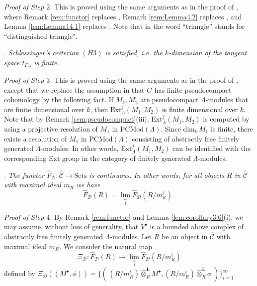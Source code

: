 \documentclass{amsart}
\theoremstyle{plain}
\theoremstyle{definition}
\theoremstyle{remark}
\begin{document}
\medskip

\noindent\textit{Proof of Step $2$.} This is proved using the same arguments as in the proof of 
\cite[Lemmas 6.1 and 6.3]{bcderived}, where 
Remark \ref{rem:functor} replaces \cite[Prop. 2.12]{bcderived}, 
Remark \ref{rem:Lemma4.2} replaces \cite[Lemma 4.2]{bcderived}, and
Lemma \ref{lem:Lemma14.1} replaces \cite[Lemma 14.1]{bcderived}.
Note that in \cite{bcderived}  the word ``triangle'' stands for ``distinguished triangle".

\medskip

. \textit{Schlessinger's criterion $(H3)$ is satisfied, i.e.
the $k$-dimension of the tangent space $t_{F_{\mathcal{D}}}$ is finite.}

\medskip

\noindent\textit{Proof of Step $3$.} This is proved using the same arguments as in the proof of 
\cite[Prop. 6.4]{bcderived}, except that we replace the assumption in \cite{bcderived} 
that $G$ has finite pseudocompact cohomology by the following fact. If $M_1,M_2$ are 
pseudocompact $\Lambda$-modules that are finite dimensional over $k$, then
$\mathrm{Ext}^j_\Lambda(M_1,M_2)$ is finite dimensional over $k$. Note that
by Remark \ref{rem:pseudocompact}(iii), $\mathrm{Ext}^j_\Lambda(M_1,M_2)$ is computed by using
a projective resolution of $M_1$ in $\mathrm{PCMod}(\Lambda)$. 
Since $\mathrm{dim}_k\,M_1$ is finite, there exists a resolution of
$M_1$ in $\mathrm{PCMod}(\Lambda)$ consisting of abstractly free finitely generated
$\Lambda$-modules. In other words, $\mathrm{Ext}^j_\Lambda(M_1,M_2)$ can be identified
with the corresponding Ext group in the category of finitely generated $\Lambda$-modules.

\medskip

. \textit{The functor $\hat{F}_{\mathcal{D}}:\hat{\mathcal{C}}\to \mathrm{Sets}$
is continuous. In other words, for all objects $R$ in $\hat{\mathcal{C}}$
with maximal ideal $m_R$ we have
$$\hat{F}_{\mathcal{D}}(R)=\lim_{\stackrel{\longleftarrow}{i}} \hat{F}_{\mathcal{D}}(R/m_R^i)\, .$$
}

\medskip

\noindent\textit{Proof of Step $4$.} 
By Remark \ref{rem:functor} and Lemma \ref{lem:corollary3.6}(i),
we may assume, without loss of generality,
that $V^\bullet$ is a bounded above complex of abstractly free finitely generated 
$\Lambda$-modules.
Let $R$ be an object in $\hat{\mathcal{C}}$ with maximal ideal $m_R$.
We consider the natural map
\begin{equation}
\label{eq:themap0}
\Xi_{\mathcal{D}}: \hat{F}_{\mathcal{D}}(R) \to \lim_{\stackrel{\longleftarrow}{i}}
\hat{F}_{\mathcal{D}}(R/m_R^i)
\end{equation}
defined by $\Xi_{\mathcal{D}}((M^\bullet,\phi))= \{(\,(R/m_R^i) \hat{\otimes}^{\mathbf{L}}_R
M^\bullet,(R/m_R^i) \hat{\otimes}^{\mathbf{L}}_R\phi \;)\}_{i=1}^\infty$.
\end{document}
